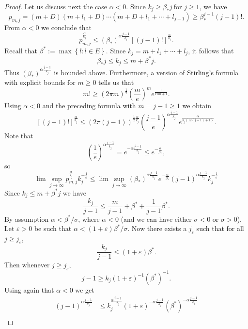 \documentclass[10pt,a4paper]{amsart}
\begin{document}
\begin{proof}
	Let us discuss next the case $\alpha<0.$ Since $k_{j}\geq\beta_{\ast}j\ $for
	$j\geq1$, we have
	\[
	p_{m,j}
	=
	\left(  m+D\right)  \left(  m+l_{1}+D\right)  \cdots\left(
	m+D+l_{1}+\cdots+l_{j-1}\right)  
	\geq
	\beta_{\ast}^{j-1}\left(  j-1\right)  !.
	\]
	From $\alpha<0$ we conclude that
	\[
	p_{m,j}^{\frac{\alpha}{k_{j}}}\leq\left(  \beta_{\ast}\right)^{\alpha
		\frac{j-1}{k_{j}}}\left[  \left(  j-1\right)  !\right]  ^{\frac{\alpha}{k_{j}%
	}}.
	\]
	Recall that  $\beta^{\ast} :=\max\left\{  l:l\in E\right\}.$ Since
	$k_{j}=m+l_{1}+\cdots+l_{j}$, it follows that
	\[
	\beta_{\ast}j\leq k_{j}\leq m+\beta^{\ast}j.
	\]
	Thus $\left(  \beta_{\ast}\right)  ^{\alpha\frac{j-1}{k_{j}}}$ is bounded above.
	Furthermore, a version of Stirling's formula 
	with explicit bounds for $m \ge 0$ tells us that
	\[
	m!\geq\left(  2\pi m\right)  ^{\frac{1}{2}}\left(  \frac{m}{e}\right)
	^{m}e^{\frac{1}{12m+1}}.
	\]
	Using $\alpha<0$ and the preceding formula with $m=j-1 \ge 1$ we obtain
	\[
	\left[  \left(  j-1\right)  !\right]  ^{\frac{\alpha}{k_{j}}}\leq\left(
	2\pi\left(  j-1\right)  \right)  ^{\frac{1}{2}\frac{\alpha}{k_{j}}}\left(
	\frac{j-1}{e}\right)  ^{\alpha\frac{j-1}{k_{j}}}e^{\frac{\alpha}{k_j (12\left(
			j-1\right)  +1)}}.
	\]
	Note that
	\[
	\left(  \frac{1}{e}\right)  ^{\alpha\frac{j-1}{k_{j}}}=e^{-\alpha\frac
		{j-1}{k_{j}}}\leq e^{-\frac{\alpha}{\beta_{\ast}}},
	\]
	so
	\[
	\lim\sup_{j\rightarrow\infty}p_{m,j}^{\frac{\alpha}{k_{j}}}k_{j}^{-\frac{1}{\sigma}
	}
	\leq
	\lim\sup_{j\rightarrow\infty}  \left(  \beta_{\ast}\right)^{\alpha
		\frac{j-1}{k_{j}}} e^{-\frac{\alpha}{\beta_{\ast}}}\left(
	j-1\right)  ^{\alpha\frac{j-1}{k_{j}}}k_{j}^{-\frac{1}{\sigma}}
	\]
	Since $k_{j}\leq m+\beta^{\ast}j$ we have
	\[
	\frac{k_{j}}{j-1}
	\leq
	\frac{m}
	{j-1}+\beta^{\ast}+\frac{1}{j - 1}\beta^{\ast}.
	\]
	By assumption $\alpha  < \beta^{\ast}/  \sigma$, where $\alpha < 0$ (and we can have either $\sigma < 0$ or $\sigma > 0$). Let $\varepsilon>0$ be such that $\alpha <  (1 + \varepsilon)\beta^{\ast}/\sigma$. Now there exists a $j_{\varepsilon}$ such that for all
	$j\geq j_{\varepsilon}$,
	\[
	\frac{k_{j}}{j-1}\leq\left(  1+\varepsilon\right)  \beta^{\ast}.
	\]
	Then whenever $j\geq j_{\varepsilon}$,
	\[
	j-1
	\geq
	k_{j}\left(
	1+\varepsilon\right)^{-1}\left(  \beta^{\ast}\right)^{-1}.
	\]
	Using again that $\alpha<0$ we get
	\begin{align*}
		\left(  j-1\right)  ^{\alpha\frac{j-1}{k_{j}}} &  \leq k_{j}^{\alpha\frac
			{j-1}{k_{j}}}\left(  1+\varepsilon\right)  ^{-\alpha\frac{j-1}{k_{j}}}\left(
		\beta^{\ast}\right)  ^{-\alpha\frac{j-1}{k_{j}}}\\

\end{align*}
\end{proof}
\end{document}
